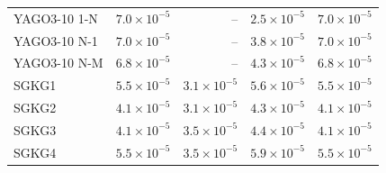 \begin{tabular}{lrrrr}
YAGO3-10 1-N & $7.0\times10^{-5}$ & – & $2.5\times10^{-5}$ & $7.0\times10^{-5}$ \\
YAGO3-10 N-1 & $7.0\times10^{-5}$ & – & $3.8\times10^{-5}$ & $7.0\times10^{-5}$ \\
YAGO3-10 N-M & $6.8\times10^{-5}$ & – & $4.3\times10^{-5}$ & $6.8\times10^{-5}$ \\
\midrule
SGKG1 & $5.5\times10^{-5}$ & $3.1\times10^{-5}$ & $5.6\times10^{-5}$ & $5.5\times10^{-5}$ \\
SGKG2 & $4.1\times10^{-5}$ & $3.1\times10^{-5}$ & $4.3\times10^{-5}$ & $4.1\times10^{-5}$ \\
SGKG3 & $4.1\times10^{-5}$ & $3.5\times10^{-5}$ & $4.4\times10^{-5}$ & $4.1\times10^{-5}$ \\
SGKG4 & $5.5\times10^{-5}$ & $3.5\times10^{-5}$ & $5.9\times10^{-5}$ & $5.5\times10^{-5}$ \\
\bottomrule
\end{tabular}
